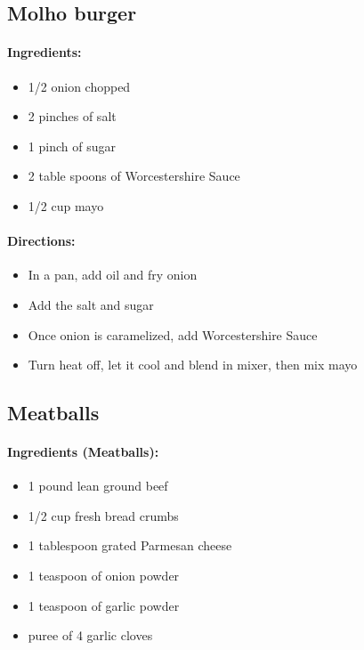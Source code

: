 \documentclass{article}
\begin{document}
\subsection{Molho burger}

\paragraph{Ingredients:}
\begin{itemize}
    \item 1/2 onion chopped
    \item 2 pinches of salt
    \item 1 pinch of sugar
    \item 2 table spoons of Worcestershire Sauce
    \item 1/2 cup mayo
\end{itemize}

\paragraph{Directions:}
\begin{itemize}
    \item In a pan, add oil and fry onion
    \item Add the salt and sugar
    \item Once onion is caramelized, add Worcestershire Sauce
    \item Turn heat off, let it cool and blend in mixer, then mix mayo
\end{itemize}

\subsection{Meatballs} 

\paragraph{Ingredients (Meatballs):}
\begin{itemize}
    \item 1 pound lean ground beef
    \item 1/2 cup fresh bread crumbs
    \item 1 tablespoon grated Parmesan cheese
    \item 1 teaspoon of onion powder
    \item 1 teaspoon of garlic powder
    \item puree of 4 garlic cloves
\end{itemize}  
\end{document}
